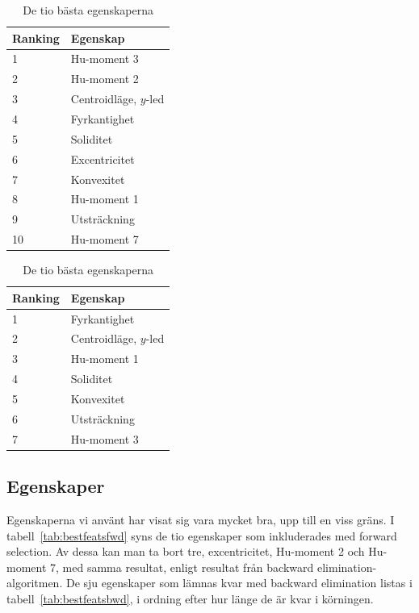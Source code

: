 \documentclass[../rapport_MVEX01-11-05]{subfiles}
\begin{document}
\begin{table}[tb]
	\centering
	\caption{De tio bästa egenskaperna}
	
	\label{tab:bestfeatsfwd}
	\begin{tabular}{ll}
		\toprule
		Ranking & Egenskap \\
		\midrule
		1 & Hu-moment 3 \\
		2 & Hu-moment 2 \\
		3 & Centroidläge, $y$-led \\
		4 & Fyrkantighet \\
		5 & Soliditet \\
		6 & Excentricitet \\
		7 & Konvexitet \\
		8 & Hu-moment 1 \\
		9 & Utsträckning \\
		10 & Hu-moment 7 \\
		\bottomrule
	\end{tabular}
\end{table}

\begin{table}[tb]
	\centering
	\caption{De tio bästa egenskaperna }
	
	\label{tab:bestfeatsfwd}
	\begin{tabular}{ll}
		\toprule
		Ranking & Egenskap \\
		\midrule
                1 & Fyrkantighet \\
                2 & Centroidläge, $y$-led \\
                3 & Hu-moment 1\\
                4 & Soliditet\\
                5 & Konvexitet \\
                6 & Utsträckning \\
                7 & Hu-moment 3 \\
		\bottomrule
	\end{tabular}
\end{table}

\subsection{Egenskaper}\label{sec:resultat_features}

Egenskaperna vi använt har visat sig vara mycket bra, upp till en viss gräns.
I tabell~\vref{tab:bestfeatsfwd} syns de tio egenskaper som inkluderades
med forward selection. Av dessa kan man ta bort tre, excentricitet,
Hu-moment 2 och Hu-moment 7,
med samma resultat, enligt resultat från backward
elimination-algoritmen. De sju egenskaper som lämnas kvar med
backward elimination listas i tabell~\vref{tab:bestfeatsbwd}, i
ordning efter hur länge de är kvar i körningen.
\end{document}
